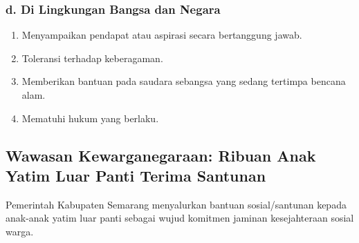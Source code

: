\subsubsection{d. Di Lingkungan Bangsa dan Negara}
\begin{enumerate}
    \item Menyampaikan pendapat atau aspirasi secara bertanggung jawab.
    \item Toleransi terhadap keberagaman.
    \item Memberikan bantuan pada saudara sebangsa yang sedang tertimpa bencana alam.
    \item Mematuhi hukum yang berlaku.
\end{enumerate}

\subsection{Wawasan Kewarganegaraan: Ribuan Anak Yatim Luar Panti Terima Santunan}
Pemerintah Kabupaten Semarang menyalurkan bantuan sosial/santunan kepada anak-anak yatim luar panti sebagai wujud komitmen jaminan kesejahteraan sosial warga.